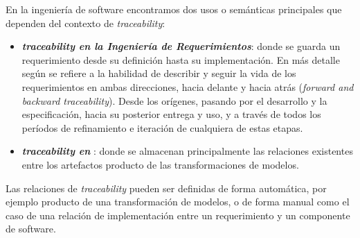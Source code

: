\documentclass[a4paper,12pt,oneside,spanish]{book}
\begin{document}
En la ingeniería de software encontramos dos usos o semánticas principales que dependen del contexto de \textit{traceability}:

\begin{itemize}

\item \textit{\textbf{traceability en la Ingeniería de Requerimientos}}: donde se guarda un requerimiento desde su definición hasta su implementación. En más detalle según \cite{GotelFinkelstein} se refiere a la habilidad de describir y seguir la vida de los requerimientos en ambas direcciones, hacia delante y hacia atrás (\textit{forward and backward traceability}). Desde los orígenes, pasando por el desarrollo y la especificación, hacia su posterior entrega y uso, y a través de todos los períodos de refinamiento e iteración de cualquiera de estas etapas.

\item \textit{\textbf{traceability en }}: donde se almacenan principalmente las relaciones existentes entre los artefactos producto de las transformaciones de modelos.

\end{itemize}


Las relaciones de \textit{traceability} pueden ser definidas de forma automática, por ejemplo producto de una transformación de modelos, o de forma manual como el caso de una relación de implementación entre un requerimiento y un componente de software.
\end{document}
